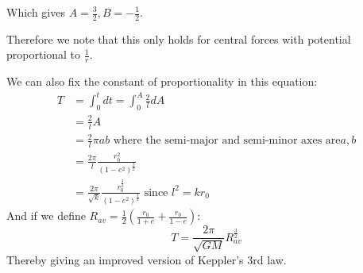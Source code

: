 \documentclass[../Main.tex]{subfiles}
\begin{document}
Which gives $A = \frac{3}{2}, B = -\frac{1}{2}$.\par
Therefore we note that this only holds for central forces with potential proportional to $\frac{1}{r}$.\par
We can also fix the constant of proportionality in this equation:
\begin{align*}
    T &= \int_0^t dt = \int_0^A \frac{2}{l} dA \\
    &= \frac{2}{l} A \\
    &= \frac{2}{l} \pi a b \text{ where the semi-major and semi-minor axes are} a, b \\
    &= \frac{2\pi}{l} \frac{r_0^2}{(1-e^2)^{\frac{3}{2}}} \\
    &= \frac{2\pi}{\sqrt{k}} \frac{r_0^{\frac{3}{2}}}{(1-e^2)^{\frac{3}{2}}} \text{ since } l^2 = kr_0
\end{align*}
And if we define $R_{av} = \frac{1}{2} \left(\frac{r_0}{1+e} + \frac{r_0}{1-e}\right)$:
\begin{equation}
    T = \frac{2\pi}{\sqrt{GM}} R_{av}^{\frac{3}{2}}
    \label{eqnKepler3Improved}
\end{equation}
Thereby giving an improved version of Keppler's 3rd law.
\end{document}
